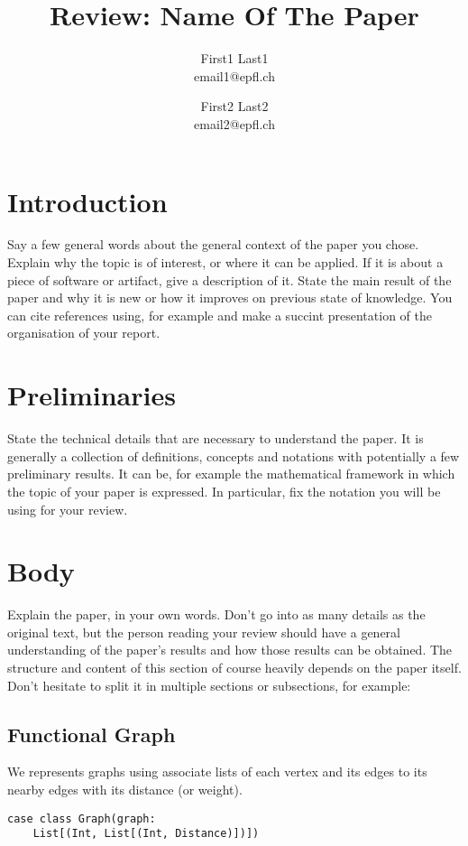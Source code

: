 \documentclass[11pt,a4paper]{article}
\title{Review: Name Of The Paper}
\author{First1 Last1 \\ email1@epfl.ch \and First2 Last2\\email2@epfl.ch}
\begin{document}
\maketitle

\section{Introduction}
Say a few general words about the general context of the paper you chose. Explain why the topic is of interest, or where it can be applied. If it is about a piece of software or artifact, give a description of it. State the main result of the paper and why it is new or how it improves on previous state of knowledge. You can cite references using, for example \cite{BibliographyManagementLaTeX} and make a succint presentation of the organisation of your report.

\section{Preliminaries}
State the technical details that are necessary to understand the paper. It is generally a collection of definitions, concepts and notations with potentially a few preliminary results. It can be, for example the mathematical framework in which the topic of your paper is expressed. In particular, fix the notation you will be using for your review.

\section{Body}
Explain the paper, in your own words. Don't go into as many details as the original text, but the person reading your review should have a general understanding of the paper's results and how those results can be obtained. The structure and content of this section of course heavily depends on the paper itself. Don't hesitate to split it in multiple sections or subsections, for example:

\subsection{Functional Graph}

We represents graphs using associate lists of each vertex and 
its edges to its nearby edges with its distance (or weight).

\begin{lstlisting}
case class Graph(graph: 
    List[(Int, List[(Int, Distance)])])
\end{lstlisting}
\end{document}
